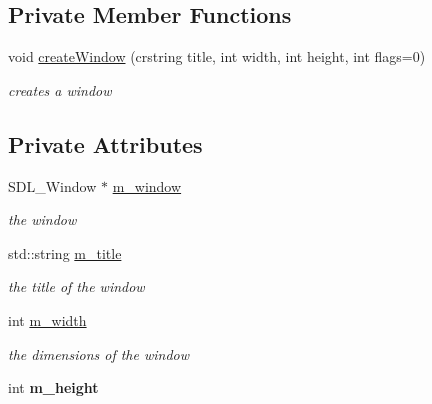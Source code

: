 \subsection*{Private Member Functions}
\begin{DoxyCompactItemize}
\item 
\mbox{\label{classnta_1_1Window_a564ca2324e54c94f9e0f19d66017c07a}} 
void \hyperlink{classnta_1_1Window_a564ca2324e54c94f9e0f19d66017c07a}{create\+Window} (crstring title, int width, int height, int flags=0)
\begin{DoxyCompactList}\small\item\em creates a window \end{DoxyCompactList}\end{DoxyCompactItemize}
\subsection*{Private Attributes}
\begin{DoxyCompactItemize}
\item 
\mbox{\label{classnta_1_1Window_a1e216236a7fdee82775fadef72a972ae}} 
S\+D\+L\+\_\+\+Window $\ast$ \hyperlink{classnta_1_1Window_a1e216236a7fdee82775fadef72a972ae}{m\+\_\+window}
\begin{DoxyCompactList}\small\item\em the window \end{DoxyCompactList}\item 
\mbox{\label{classnta_1_1Window_a9034f9c0d5054ffd61782e2722432c63}} 
std\+::string \hyperlink{classnta_1_1Window_a9034f9c0d5054ffd61782e2722432c63}{m\+\_\+title}
\begin{DoxyCompactList}\small\item\em the title of the window \end{DoxyCompactList}\item 
\mbox{\label{classnta_1_1Window_aafa280d9434d31442028729eb0b01689}} 
int \hyperlink{classnta_1_1Window_aafa280d9434d31442028729eb0b01689}{m\+\_\+width}
\begin{DoxyCompactList}\small\item\em the dimensions of the window \end{DoxyCompactList}\item 
\mbox{\label{classnta_1_1Window_a3857aecdc891f739b24030f7e8423529}} 
int {\bfseries m\+\_\+height}
\end{DoxyCompactItemize}
